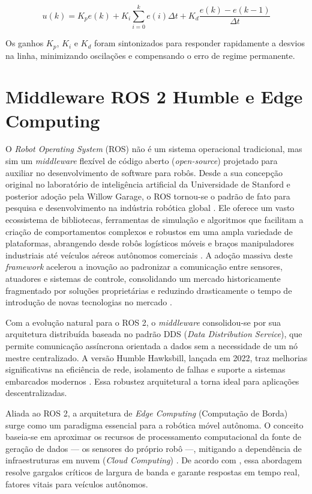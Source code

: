 \begin{equation}
    u(k) = K_p e(k) + K_i \sum_{i=0}^{k} e(i) \Delta t + K_d \frac{e(k) - e(k-1)}{\Delta t}
    \label{eq:pid_discreto}
\end{equation}

Os ganhos $K_p$, $K_i$ e $K_d$ foram sintonizados para responder rapidamente a desvios na linha, minimizando oscilações e compensando o erro de regime permanente.


\section{Middleware ROS 2 Humble e Edge Computing}

O \textit{Robot Operating System} (ROS) não é um sistema operacional tradicional, mas sim um \textit{middleware} flexível de código aberto (\textit{open-source}) projetado para auxiliar no desenvolvimento de software para robôs. Desde a sua concepção original no laboratório de inteligência artificial da Universidade de Stanford e posterior adoção pela Willow Garage, o ROS tornou-se o padrão de fato para pesquisa e desenvolvimento na indústria robótica global \cite{quigley2009ros}. Ele oferece um vasto ecossistema de bibliotecas, ferramentas de simulação e algoritmos que facilitam a criação de comportamentos complexos e robustos em uma ampla variedade de plataformas, abrangendo desde robôs logísticos móveis e braços manipuladores industriais até veículos aéreos autônomos comerciais \cite{koubaa2017robot, albonico2023software}. A adoção massiva deste \textit{framework} acelerou a inovação ao padronizar a comunicação entre sensores, atuadores e sistemas de controle, consolidando um mercado historicamente fragmentado por soluções proprietárias e reduzindo drasticamente o tempo de introdução de novas tecnologias no mercado \cite{niloy2021critical}.

Com a evolução natural para o ROS 2, o \textit{middleware} consolidou-se por sua arquitetura distribuída baseada no padrão DDS (\textit{Data Distribution Service}), que permite comunicação assíncrona orientada a dados sem a necessidade de um nó mestre centralizado. A versão Humble Hawksbill, lançada em 2022, traz melhorias significativas na eficiência de rede, isolamento de falhas e suporte a sistemas embarcados modernos \cite{macenski2022robot}. Essa robustez arquitetural a torna ideal para aplicações descentralizadas.

Aliada ao ROS 2, a arquitetura de \textit{Edge Computing} (Computação de Borda) surge como um paradigma essencial para a robótica móvel autônoma. O conceito baseia-se em aproximar os recursos de processamento computacional da fonte de geração de dados — os sensores do próprio robô —, mitigando a dependência de infraestruturas em nuvem (\textit{Cloud Computing}) \cite{shi2016edge, satyanarayanan2017emergence}. De acordo com , essa abordagem resolve gargalos críticos de largura de banda e garante respostas em tempo real, fatores vitais para veículos autônomos.

